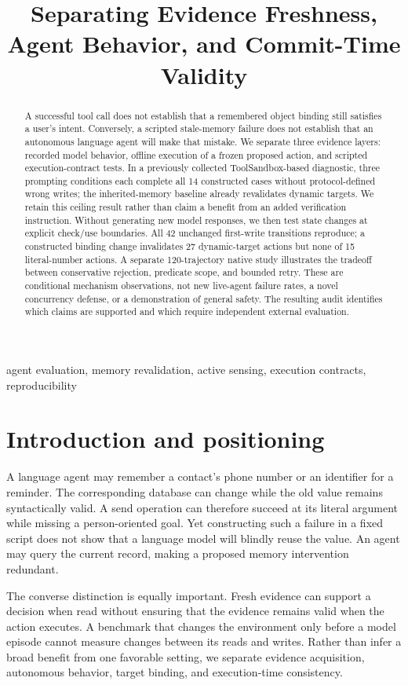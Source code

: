\documentclass[10pt,letterpaper]{article}
\title{Separating Evidence Freshness, Agent Behavior, and Commit-Time Validity}
\begin{document}
\maketitle
\begin{abstract}
A successful tool call does not establish that a remembered object binding still satisfies a user's intent. Conversely, a scripted stale-memory failure does not establish that an autonomous language agent will make that mistake. We separate three evidence layers: recorded model behavior, offline execution of a frozen proposed action, and scripted execution-contract tests. In a previously collected ToolSandbox-based diagnostic, three prompting conditions each complete all 14 constructed cases without protocol-defined wrong writes; the inherited-memory baseline already revalidates dynamic targets. We retain this ceiling result rather than claim a benefit from an added verification instruction. Without generating new model responses, we then test state changes at explicit check/use boundaries. All 42 unchanged first-write transitions reproduce; a constructed binding change invalidates 27 dynamic-target actions but none of 15 literal-number actions. A separate 120-trajectory native study illustrates the tradeoff between conservative rejection, predicate scope, and bounded retry. These are conditional mechanism observations, not new live-agent failure rates, a novel concurrency defense, or a demonstration of general safety. The resulting audit identifies which claims are supported and which require independent external evaluation.
\end{abstract}
\begin{keywords}
agent evaluation, memory revalidation, active sensing, execution contracts, reproducibility
\end{keywords}

\section{Introduction and positioning}
A language agent may remember a contact's phone number or an identifier for a reminder. The corresponding database can change while the old value remains syntactically valid. A send operation can therefore succeed at its literal argument while missing a person-oriented goal. Yet constructing such a failure in a fixed script does not show that a language model will blindly reuse the value. An agent may query the current record, making a proposed memory intervention redundant.

The converse distinction is equally important. Fresh evidence can support a decision when read without ensuring that the evidence remains valid when the action executes. A benchmark that changes the environment only before a model episode cannot measure changes between its reads and writes. Rather than infer a broad benefit from one favorable setting, we separate evidence acquisition, autonomous behavior, target binding, and execution-time consistency.
\end{document}
